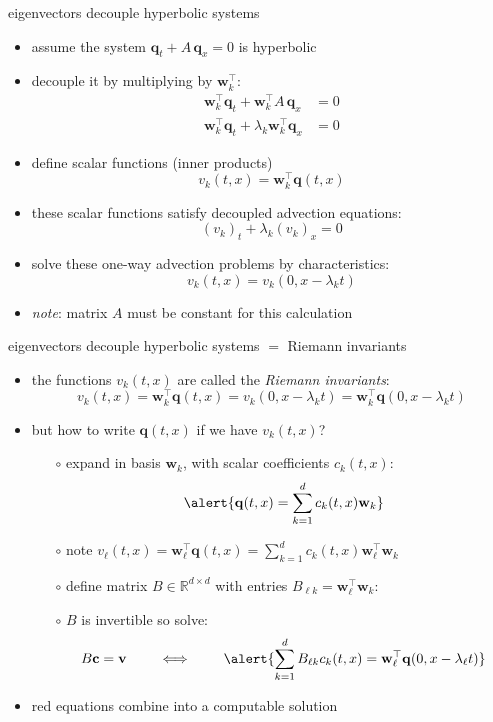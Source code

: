 \documentclass[10pt,dvipsnames,usepdftitle=false,
hyperref={pdftitle = {Finite volume methods},
    pdfauthor = {Ed Bueler}}]{beamer}
\newcommand{\bc}{\mathbf{c}}
\newcommand{\bq}{\mathbf{q}}
\newcommand{\bv}{\mathbf{v}}
\newcommand{\bw}{\mathbf{w}}
\newcommand{\RR}{\mathbb{R}}
\newcommand{\ds}{\displaystyle}
\begin{document}
\begin{frame}{eigenvectors decouple hyperbolic systems}

\begin{itemize}
\item assume the system $\bq_t + A\, \bq_x=0$ is hyperbolic
\item decouple it by multiplying by $\bw_k^\top$:
\begin{align*}
\bw_k^\top \bq_t + \bw_k^\top A\, \bq_x &= 0 \\
\bw_k^\top \bq_t + \lambda_k \bw_k^\top \bq_x &= 0
\end{align*}
\item define scalar functions (inner products)
    $$v_k(t,x) = \bw_k^\top \bq(t,x)$$
\item these scalar functions satisfy decoupled advection equations:
   $$(v_k)_t + \lambda_k (v_k)_x = 0$$
\item solve these one-way advection problems by characteristics:
   $$v_k(t,x) = v_k(0,x-\lambda_k t)$$
\item \emph{note}: \alert{matrix $A$ must be constant for this calculation}
\end{itemize}
\end{frame}


\begin{frame}{eigenvectors decouple hyperbolic systems $=$ Riemann invariants}

\begin{itemize}
\item the functions $v_k(t,x)$ are called the \emph{Riemann invariants}:
    $$v_k(t,x) = \bw_k^\top \bq(t,x) = v_k(0,x-\lambda_k t) = \bw_k^\top \bq(0,x-\lambda_k t)$$

\item but how to write $\bq(t,x)$ if we have $v_k(t,x)$?
    \begin{itemize}
    \item[$\circ$] expand in basis $\bw_k$, with scalar coefficients $c_k(t,x)$:
    $$\alert{\bq(t,x) = \sum_{k=1}^d c_k(t,x) \bw_k}$$
    \item[$\circ$] note \qquad $\ds v_\ell(t,x) = \bw_\ell^\top \bq(t,x) = \sum_{k=1}^d c_k(t,x) \bw_\ell^\top \bw_k$
    \item[$\circ$] define matrix $B\in \RR^{d\times d}$ with entries \alert{$B_{\ell k} = \bw_\ell^\top \bw_k$}:
    \item[$\circ$] $B$ is invertible so solve:
    $$B \bc = \bv \qquad \iff \qquad \alert{\sum_{k=1}^d B_{\ell k} c_k(t,x) = \bw_\ell^\top \bq(0,x-\lambda_\ell t)}$$
    \end{itemize}
\item \alert{red equations} combine into a computable solution
\end{itemize}
\end{frame}
\end{document}
